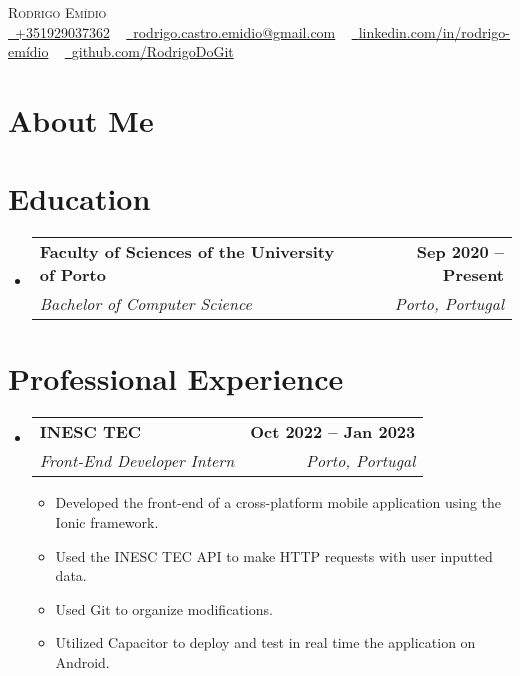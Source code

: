 \documentclass[letterpaper,11pt]{article}
\makeatletter
\newcommand{\resumeItem}[1]{
  \item\small{
    {#1 \vspace{-2pt}}
  }
}
\newcommand{\resumeSubheading}[4]{
  \vspace{-2pt}\item
    \begin{tabular*}{1.0\textwidth}[t]{l@{\extracolsep{\fill}}r}
      \textbf{#1} & \textbf{\small #2} \\
      \textit{\small#3} & \textit{\small #4} \\
    \end{tabular*}\vspace{-7pt}
}
\newcommand{\resumeSubHeadingListStart}{\begin{itemize}[leftmargin=0.0in, label={}]}
\newcommand{\resumeSubHeadingListEnd}{\end{itemize}}
\newcommand{\resumeItemListStart}{\begin{itemize}}
\newcommand{\resumeItemListEnd}{\end{itemize}\vspace{-5pt}}
\makeatother
\begin{document}

\begin{center}
    {\Huge \scshape Rodrigo Emídio} \\ \vspace{5pt}
    \small \href{tel:+351929037362}{\raisebox{-0.1\height}\faPhone\ {+351929037362}} ~ \href{mailto:rodrigo.castro.emidio@gmail.com}{\raisebox{-0.2\height}\faEnvelope\ {rodrigo.castro.emidio@gmail.com}} ~ 
    \href{https://www.linkedin.com/in/rodrigo-emídio/}{\raisebox{-0.2\height}\faLinkedin\ {linkedin.com/in/rodrigo-emídio}}  ~
    \href{https://github.com/RodrigoDoGit}{\raisebox{-0.2\height}\faGithub\ {github.com/RodrigoDoGit}}
    \vspace{-8pt}
\end{center}

\section{About Me}

\section{Education}
  \resumeSubHeadingListStart
    \resumeSubheading
      {Faculty of Sciences of the University of Porto}{Sep 2020 -- Present}
      {Bachelor of Computer Science}{Porto, Portugal}
  \resumeSubHeadingListEnd

\section{Professional Experience}
  \resumeSubHeadingListStart
    \resumeSubheading
      {INESC TEC}{Oct 2022 -- Jan 2023}
      {Front-End Developer Intern}{Porto, Portugal}
      \resumeItemListStart
        \resumeItem{Developed the front-end of a cross-platform mobile application using the Ionic framework.}
        \resumeItem{Used the INESC TEC API to make HTTP requests with user inputted data.}
        \resumeItem{Used Git to organize modifications.}
        \resumeItem{Utilized Capacitor to deploy and test in real time the application on Android.}
    \resumeItemListEnd
    \resumeSubHeadingListEnd
\vspace{-16pt}
\end{document}
